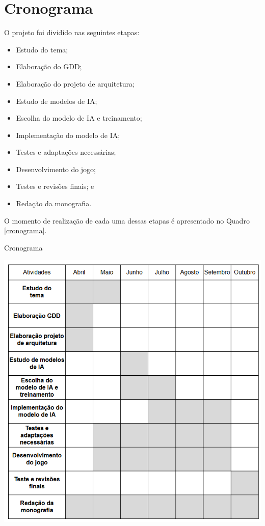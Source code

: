 \chapter{Cronograma}
\label{c.cronograma}

O projeto foi dividido nas seguintes etapas:

\begin{itemize}
    \item Estudo do tema;
    \item Elaboração do GDD;
    \item Elaboração do projeto de arquitetura;
    \item Estudo de modelos de IA;
    \item Escolha do modelo de IA e treinamento;
    \item Implementação do modelo de IA;
    \item Testes e adaptações necessárias;
    \item Desenvolvimento do jogo;
    \item Testes e revisões finais; e
    \item Redação da monografia.
\end{itemize}  

O momento de realização de cada uma dessas etapas é apresentado no Quadro \ref{cronograma}.\\


\begin{quadro}
    \centering
    \caption{Cronograma}
    \includegraphics[width=1\linewidth]{figs/cronograma.PNG}
    \label{cronograma}
\end{quadro}


